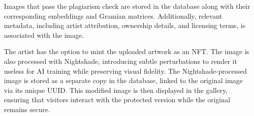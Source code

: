 Images that pass the plagiarism check are stored in the database along with their corresponding embeddings and Gramian matrices. Additionally, relevant metadata, including artist attribution, ownership details, and licensing terms, is associated with the image.

The artist has the option to mint the uploaded artwork as an NFT. The image is also processed with Nightshade, introducing subtle perturbations to render it useless for AI training while preserving visual fidelity. The Nightshade-processed image is stored as a separate copy in the database, linked to the original image via its unique UUID. This modified image is then displayed in the gallery, ensuring that visitors interact with the protected version while the original remains secure.
